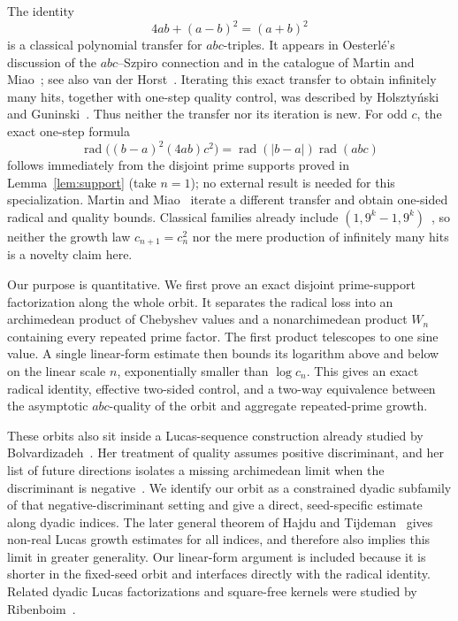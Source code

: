 \documentclass[11pt]{article}
\theoremstyle{remark}
\newcommand{\rad}{\operatorname{rad}}
\begin{document}
The identity
\[
 4ab+(a-b)^2=(a+b)^2                                      \tag{1.1}
\]
is a classical polynomial transfer for \(abc\)-triples.  It appears in
Oesterl\'e's discussion of the \(abc\)--Szpiro connection
\cite[p.~170]{Oesterle1988} and in the catalogue of Martin and
Miao~\cite[\S2.4]{MartinMiao2016}; see also
van der Horst~\cite[\S2.3]{vanderHorst2010}.  Iterating this exact
transfer to obtain infinitely many hits, together with one-step quality
control, was described by Holszty\'nski~\cite{Holsztynski2017} and
Guninski~\cite{Guninski2020}.  Thus neither the transfer nor its
iteration is new.  For odd \(c\), the exact one-step formula
\[
 \rad\bigl((b-a)^2(4ab)c^2\bigr)
 =\rad(|b-a|)\rad(abc)
\]
follows immediately from the disjoint prime supports proved in
Lemma~\ref{lem:support} (take \(n=1\)); no external result is needed
for this specialization.
Martin and Miao~\cite[\S3.1]{MartinMiao2016} iterate a different
transfer and obtain one-sided radical and quality bounds.
Classical families already include
\((1,9^k-1,9^k)\)~\cite{AlvarezEtAl2023}, so neither the growth law
\(c_{n+1}=c_n^2\) nor the mere production of infinitely many hits is a
novelty claim here.

Our purpose is quantitative.  We first prove an exact disjoint
prime-support factorization along the whole orbit.  It separates the
radical loss into an archimedean product of Chebyshev values and a
nonarchimedean product \(W_n\) containing every repeated prime factor.
The first product telescopes to one sine value.  A single linear-form
estimate then bounds its logarithm above and below on the linear scale
\(n\), exponentially smaller than \(\log c_n\).  This gives an exact
radical identity, effective two-sided control, and a two-way equivalence
between the asymptotic \(abc\)-quality of the orbit and aggregate
repeated-prime growth.

These orbits also sit inside a Lucas-sequence construction already
studied by Bolvardizadeh~\cite[Ch.~2]{Bolvardizadeh2023}.  Her treatment
of quality assumes positive discriminant, and her list of future
directions isolates a missing archimedean limit when the discriminant is
negative~\cite[pp.~63--64]{Bolvardizadeh2023}.  We identify our orbit as
a constrained dyadic subfamily of that negative-discriminant setting and
give a direct, seed-specific estimate along dyadic indices.  The later
general theorem of Hajdu and Tijdeman~\cite[Theorem~2.1 and
Remark~1]{HajduTijdeman2025} gives non-real Lucas growth estimates for
all indices, and therefore also implies this limit in greater
generality.  Our linear-form argument is included because it is shorter
in the fixed-seed orbit and interfaces directly with the radical
identity.  Related dyadic Lucas factorizations and square-free kernels
were studied by Ribenboim~\cite{Ribenboim2002}.
\end{document}
